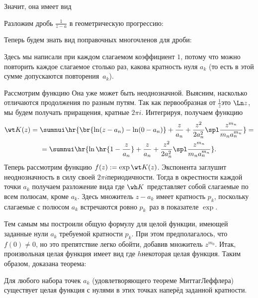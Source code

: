 \documentclass[a4paper]{article}
\begin{document}
Значит, она имеет вид

Разложим дробь $\frac{1}{z-a}$
в геометрическую прогрессию:

Теперь будем знать вид поправочных многочленов для дроби:


Здесь мы написали при каждом слагаемом коэффициент $1$, потому что можно повторить каждое слагаемое
столько раз, какова кратность нуля $a_k$ (то есть в этой сумме допускаются повторения~$a_k$).

Рассмотрим функцию
Она уже может быть неоднозначной. Выясним, насколько отличаются продолжения по разным путям.
Так как первообразная от $\frac1z$\т это $\Ln z$, мы будем получать приращения, кратные $2\pi i$.
Интегрируя, получаем функцию
\begin{multline}\wt K(z) = \sumnui\hr{\br{\ln(z-a_n) - \ln(0-a_n)} +
\frac{z}{a_n} + \frac{z^2}{2a_n^2}\spl \frac{z^{m_n}}{m_n a_n^{m_n}}} =\\=
\sumnui\hr{\ln\hr{1-\frac{z}{a_n}} + \frac{z}{a_n} + \frac{z^2}{2a_n^2}\spl \frac{z^{m_n}}{m_n a_n^{m_n}}}.
\end{multline}
Теперь рассмотрим функцию $f(z) := \exp\wt K(z)$. Экспонента заглушит неоднозначность в силу
своей $2\pi i$\д периодичности. Тогда в окрестности каждой точки $a_k$ получаем разложение вида
где $\wh K$ представляет собой слагаемые по всем полюсам, кроме $a_k$. Здесь множитель
$z-a_k$ имеет кратность $p_k$, поскольку слагаемые с полюсом $a_k$ встречаются ровно
$p_k$~раз в показателе $\exp$.

Тем самым мы построили общую формулу для целой функции, имеющей заданные нули $a_k$
требуемой кратности $p_k$. При этом предполагалось, что $f(0) \neq 0$, но это препятствие
легко обойти, добавив множитель $z^{m_0}$. Итак, произвольная целая функция имеет вид
где $h$\т некоторая целая функция. Таким образом, доказана теорема:
\begin{theorem}[Вейерштрасса]
Для любого набора точек $a_k$ (удовлетворяющего теореме Миттаг\д Леффлера) существует
целая функция с нулями в этих точках наперёд заданной кратности.
\end{theorem}
\end{document}
